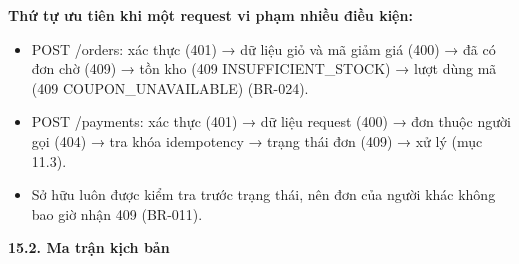 \documentclass[11pt,a4paper,oneside]{report}
\begin{document}
\textbf{Thứ tự ưu tiên khi một request vi phạm nhiều điều kiện:}

\begin{itemize}
\item
  POST /orders: xác thực (401) → dữ liệu giỏ và mã giảm giá (400) → đã có đơn chờ (409) → tồn kho (409 INSUFFICIENT\_STOCK) → lượt dùng mã (409 COUPON\_UNAVAILABLE) (BR-024).
\item
  POST /payments: xác thực (401) → dữ liệu request (400) → đơn thuộc người gọi (404) → tra khóa idempotency → trạng thái đơn (409) → xử lý (mục 11.3).
\item
  Sở hữu luôn được kiểm tra trước trạng thái, nên đơn của người khác không bao giờ nhận 409 (BR-011).
\end{itemize}

\textbf{15.2. Ma trận kịch bản}
\end{document}
